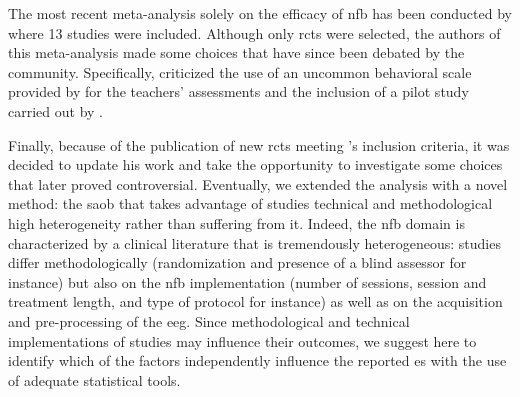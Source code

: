 The most recent meta-analysis solely on the efficacy of \gls{nfb} has been conducted by \citet{Cortese2016} where 13
studies were included. Although only \glspl{rct} were selected, the authors of this meta-analysis made some choices that
have since been debated by the community. Specifically, \citet{Micoulaud2016} criticized the use of an uncommon
behavioral scale provided by \citet{Steiner2014} for the teachers' assessments and the inclusion of a pilot study
carried out by \citet{Arnold2014}. 

Finally, because of the publication of new \glspl{rct} meeting \citeauthor{Cortese2016}'s inclusion criteria, it was
decided to update his work and take the opportunity to investigate some choices that later proved controversial.
Eventually, we extended the analysis with a novel method: the \gls{saob} that takes advantage of studies technical and
methodological high heterogeneity rather than suffering from it. Indeed, the \gls{nfb} domain is characterized by a
clinical literature that is tremendously heterogeneous: studies differ methodologically (randomization and presence of a
blind assessor for instance) but also on the \gls{nfb} implementation (number of sessions, session and treatment length,
and type of protocol for instance) as well as on the acquisition and pre-processing of the \gls{eeg}. Since
methodological and technical implementations of studies may influence their outcomes, we suggest here to identify which
of the factors independently influence the reported \gls{es} with the use of adequate statistical tools.






